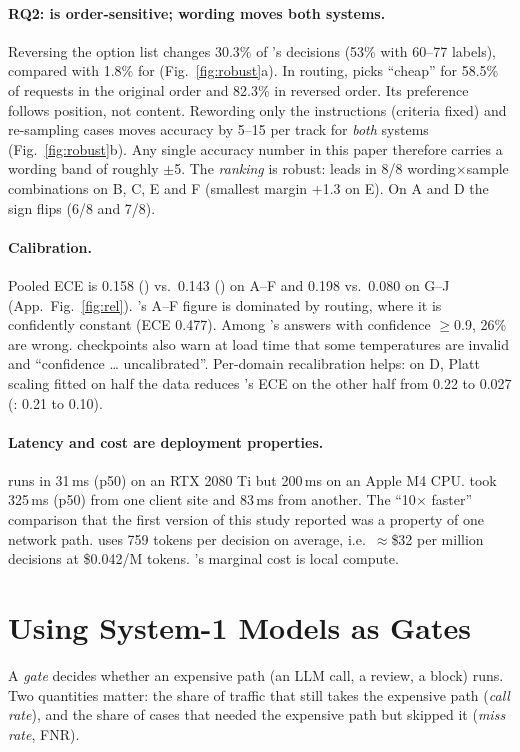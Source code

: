 \paragraph{RQ2: \laya{} is order-sensitive; wording moves both systems.}
Reversing the option list changes 30.3\% of \laya{}'s decisions (53\% with 60--77 labels), compared with 1.8\% for \jev{} (Fig.~\ref{fig:robust}a). In routing, \laya{} picks ``cheap'' for 58.5\% of requests in the original order and 82.3\% in reversed order. Its preference follows position, not content. Rewording only the instructions (criteria fixed) and re-sampling cases moves accuracy by 5--15\pp{} per track for \emph{both} systems (Fig.~\ref{fig:robust}b). Any single accuracy number in this paper therefore carries a wording band of roughly $\pm$5\pp{}. The \emph{ranking} is robust: \jev{} leads in 8/8 wording$\times$sample combinations on B, C, E and F (smallest margin +1.3\pp{} on E). On A and D the sign flips (6/8 and 7/8).

\paragraph{Calibration.}
Pooled ECE is 0.158 (\laya{}) vs.\ 0.143 (\jev{}) on A--F and 0.198 vs.\ 0.080 on G--J (App.~Fig.~\ref{fig:rel}). \jev{}'s A--F figure is dominated by routing, where it is confidently constant (ECE 0.477). Among \laya{}'s answers with confidence $\geq$0.9, 26\% are wrong. \laya{} checkpoints also warn at load time that some temperatures are invalid and ``confidence \ldots{} uncalibrated''. Per-domain recalibration helps: on D, Platt scaling fitted on half the data reduces \laya{}'s ECE on the other half from 0.22 to 0.027 (\jev{}: 0.21 to 0.10).

\paragraph{Latency and cost are deployment properties.}
\laya{} runs in 31\,ms (p50) on an RTX 2080 Ti but 200\,ms on an Apple M4 CPU. \jev{} took 325\,ms (p50) from one client site and 83\,ms from another. The ``10$\times$ faster'' comparison that the first version of this study reported was a property of one network path. \jev{} uses 759 tokens per decision on average, i.e.\ $\approx$\$32 per million decisions at \$0.042/M tokens. \laya{}'s marginal cost is local compute.

\section{Using System-1 Models as Gates}\label{sec:gates}
A \emph{gate} decides whether an expensive path (an LLM call, a review, a block) runs. Two quantities matter: the share of traffic that still takes the expensive path (\emph{call rate}), and the share of cases that needed the expensive path but skipped it (\emph{miss rate}, FNR).

